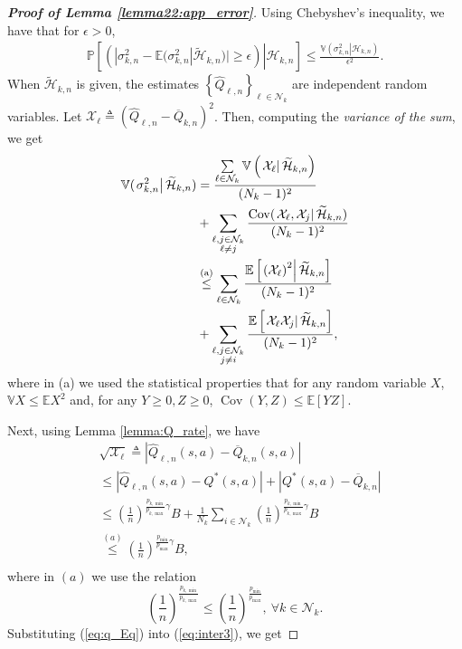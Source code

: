 \documentclass[lettersize,journal]{IEEEtran}
\begin{document}
\begin{appendices}
\begin{proof}[\textbf{Proof of Lemma \ref{lemma22:app_error}}]
 Using Chebyshev's inequality, we have  that for $\epsilon>0$,
\begin{align}
\label{eq:Prob_error}
    \mathbb{P}\left[\left(\left.|\sigma_{k,n}^2- \mathbb{E}(\sigma_{k,n}^2|\widetilde{\mathcal{H}}_{k,n})|\geq \epsilon \right)\right |\mathcal{H}_{k,n}\right]\leq \frac{\mathbb{V}(\left. \sigma_{k,n}^2\right|\mathcal{H}_{k,n})}{\epsilon^2}. 
\end{align}
When $\widetilde{\mathcal{H}}_{k,n}$ is given, the estimates $\left\{\widehat{Q}_{\ell,n}\right\}_{\ell\in\mathcal{N}_k}$ are  independent random variables. Let  $\mathcal{X}_{\ell}\triangleq \left(\widehat{Q}_{\ell,n}-\overline{Q}_{k,n}\right)^2$. Then, computing the \textit{variance of the sum}, we get 
\begin{align}
\label{eq:inter3}
   \mathbb{V}(\left. \sigma_{k,n}^2\right|\widetilde{\mathcal{H}}_{k,n})&= \frac{\sum\limits_{\ell\in\mathcal{N}_k}\mathbb{V}\left(\left.\mathcal{X}_{\ell}\right|\widetilde{\mathcal{H}}_{k,n}\right)}{(N_k-1)^2} \nonumber
   \\
   &+\sum\limits_{\substack{\ell,j\in\mathcal{N}_k\\ \ell\neq j}}\frac{\operatorname{Cov}(\left.\mathcal{X}_{\ell},\mathcal{X}_j\right|\widetilde{\mathcal{H}}_{k,n})}{(N_k-1)^2} \nonumber\\
   & \stackrel{\textnormal{(a)}}{\leq} \sum\limits_{\ell\in \mathcal{N}_k}\frac{\mathbb{E}\left[\left.\left(\mathcal{X}_{\ell}\right)^2\right|\widetilde{\mathcal{H}}_{k,n}\right]}{(N_k-1)^2}\nonumber\\
&+\sum\limits_{\substack{\ell,j\in\mathcal{N}_k\\ j\neq i}}\frac{\mathbb{E}\left[\left.\mathcal{X}_{\ell}\mathcal{X}_j\right|\widetilde{\mathcal{H}}_{k,n}\right]}{(N_k-1)^2},
\end{align}
 where in (a) we used the statistical properties that for any random variable $X$, $\mathbb{V}X \leq \mathbb{E} X^2$ and, for any $Y\geq 0, Z\geq 0$, $\operatorname{Cov}(Y,Z)\leq \mathbb{E}[Y  Z]$.  \par 
 Next, using Lemma \ref{lemma:Q_rate}, we have
 \begin{align}
\label{eq:q_Eq}
    &\sqrt{\mathcal{X}_{\ell}}\triangleq |\widehat{Q}_{\ell,n}(s,a)-\overline{Q}_{k,n}(s,a)|\nonumber\\
    &\leq |\widehat{Q}_{\ell,n}(s,a)-Q^{*}(s,a)| +|Q^{*}(s,a)-\overline{Q}_{k,n}|\nonumber\\
    &\leq\left(\frac{1}{n}\right)^{\frac{p_{k,\min}}{p_{k,\max}}\gamma}B +\frac{1}{N_k}\sum\limits_{i\in\mathcal{N}_k}\left(\frac{1}{n}\right)^{\frac{p_{k,\min}}{p_{k,\max}}\gamma}B \nonumber\\
     &\stackrel{\text{$(a)$}}{\leq}\left(\frac{1}{n}\right)^{\frac{p_{\min}}{p_{\max}}\gamma}B,   \nonumber\\
\end{align}
where in $(a)$ we use the relation $$\left(\frac{1}{n}\right)^{\frac{p_{k,\min}}{p_{k,\max}}}\leq\left(\frac{1}{n}\right)^{\frac{p_{\min}}{p_{\max}}}, \ \forall k \in \mathcal{N}_k.$$
  Substituting (\ref{eq:q_Eq}) into (\ref{eq:inter3}),  we get


\end{proof}
\end{appendices}
\end{document}
